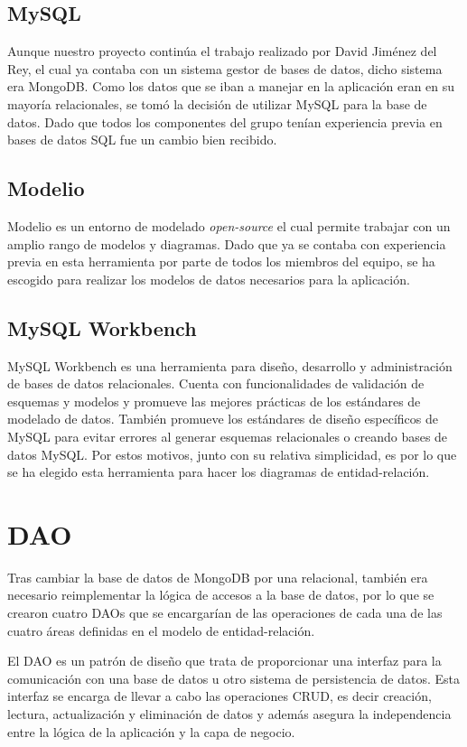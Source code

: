 \documentclass[11pt]{book}
\begin{document}
	\section{MySQL}
	Aunque nuestro proyecto continúa el trabajo realizado por David Jiménez del Rey, el cual ya contaba con un sistema gestor de bases de datos, dicho sistema era MongoDB. Como los datos que se iban a manejar en la aplicación eran en su mayoría relacionales, se tomó la decisión de utilizar MySQL para la base de datos. Dado que todos los componentes del grupo tenían experiencia previa en bases de datos SQL fue un cambio bien recibido.
	
	\section{Modelio}	
	Modelio es un entorno de modelado \emph{open-source} el cual permite trabajar con un amplio rango de modelos y diagramas. Dado que ya se contaba con experiencia previa en esta herramienta por parte de todos los miembros del equipo, se ha escogido para realizar los modelos de datos necesarios para la aplicación.
	
	\section{MySQL Workbench}
	MySQL Workbench es una herramienta para diseño, desarrollo y administración de bases de datos relacionales. 
	Cuenta con funcionalidades de validación de esquemas y modelos y promueve las mejores prácticas de los estándares de modelado de datos. También promueve los estándares de diseño específicos de MySQL para evitar errores al generar esquemas relacionales o creando bases de datos MySQL. Por estos motivos, junto con su relativa simplicidad, es por lo que se ha elegido esta herramienta para hacer los diagramas de entidad-relación.
	
	
	\chapter{DAO}\label{cap:daos}
	
	Tras cambiar la base de datos de MongoDB por una relacional, también era necesario reimplementar la lógica de accesos a la base de datos, por lo que se crearon cuatro DAOs que se encargarían de las operaciones de cada una de las cuatro áreas definidas en el modelo de entidad-relación.
	
	El DAO es un patrón de diseño que trata de proporcionar una interfaz para la comunicación con una base de datos u otro sistema de persistencia de datos. Esta interfaz se encarga de llevar a cabo las operaciones CRUD, es decir creación, lectura, actualización y eliminación de datos y además asegura la independencia entre la lógica de la aplicación y la capa de negocio.
	
\end{document}
